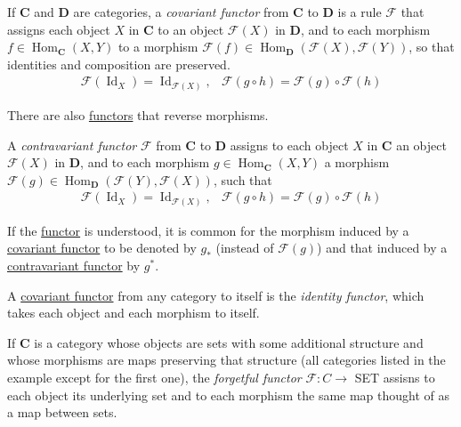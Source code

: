 \documentclass{article}
\DeclareMathOperator{\Id}{Id}
\DeclareMathOperator{\Hom}{Hom}
\newcounter{definition}[section]
\newcounter{example}[section]
\begin{document}
    \begin{definition}
      \label{def:covariant-functor}
    If $\mathbf{C}$ and $\mathbf{D}$ are categories, a \textit{covariant functor} from $\mathbf{C}$ to $\mathbf{D}$ is a rule $\mathcal{F}$ that assigns each object $X$ in $\mathbf{C}$ to an object $\mathcal{F}(X)$ in $\mathbf{D}$, and to each morphism $f \in \Hom_\mathbf{C} (X ,Y)$ to a morphism $\mathcal{F}(f) \in \Hom_\mathbf{D} (\mathcal{F}(X), \mathcal{F}(Y))$, so that identities and composition are preserved.
    \begin{align*}
        \mathcal{F}(\Id_X) = \Id_{\mathcal{F}(X)}, & \mathcal{F}(g \circ h) = \mathcal{F}(g) \circ \mathcal{F} (h)
    \end{align*}
    \end{definition}

    There are also \hyperref[cat-def:functor]{functors} that reverse morphisms. 

    \begin{definition}
      \label{def:contravariant-functor}
    A \textit{contravariant functor} $\mathcal{F}$ from $\mathbf{C}$ to $\mathbf{D}$ assigns to each object $X$ in $\mathbf{C}$ an object $\mathcal{F}(X)$ in $\mathbf{D}$, and to each morphism $g \in \Hom_\mathbf{C} (X, Y)$ a morphism $\mathcal{F}(g) \in \Hom_\mathbf{D}(\mathcal{F}(Y), \mathcal{F}(X))$, such that
    \begin{align*}
        \mathcal{F}(\Id_X) = \Id_{\mathcal{F}(X)}, & \mathcal{F}(g \circ h) = \mathcal{F}(g) \circ \mathcal{F}(h)
    \end{align*}
    \end{definition}

    If the \hyperref[cat-def:functor]{functor} is understood, it is common for the morphism induced by a \hyperref[def:covariant-functor]{covariant functor} to be denoted by $g_*$ (instead of $\mathcal{F} (g)$) and that induced by a \hyperref[def:contravariant-functor]{contravariant functor} by $g^*$. 

    \begin{definition}
      \label{def:identity-functor}
    A \hyperref[def:covariant-functor]{covariant functor} from any category to itself is the \textit{identity functor}, which takes each object and each morphism to itself. 
    \end{definition}

    \begin{definition}
      \label{def:forgetful-functor}
    If $\mathbf{C}$ is a category whose objects are sets with some additional structure and whose morphisms are maps preserving that structure (all categories listed in the example except for the first one), the \textit{forgetful functor} $\mathcal{F}: C \to $ SET assisns to each object its underlying set and to each morphism the same map thought of as a map between sets. 
    \end{definition}
\end{document}

